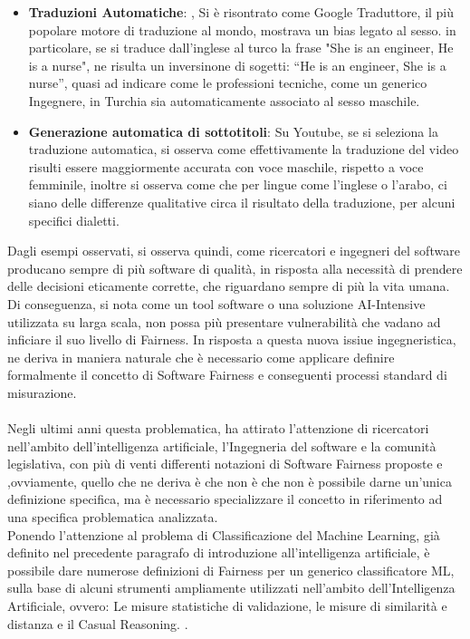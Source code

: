 \begin{itemize}
    \item \textbf{Traduzioni Automatiche}: \cite{biasInML}, Si è risontrato come Google Traduttore, il più popolare motore di traduzione al mondo, mostrava un bias legato al sesso. in particolare, se si traduce dall'inglese al turco la frase "She is an engineer, He is a nurse", ne risulta un inversinone di sogetti: “He is an engineer, She is a nurse”, quasi ad indicare come le professioni tecniche, come un generico Ingegnere, in Turchia sia automaticamente associato al sesso maschile.
    
    \item \textbf{Generazione automatica di sottotitoli}: \cite{tatman-2017-gender} Su Youtube, se si seleziona la traduzione automatica, si osserva come effettivamente la traduzione del video risulti essere maggiormente accurata con voce maschile, rispetto a voce femminile, inoltre si osserva come che per lingue come l'inglese o l'arabo, ci siano delle differenze qualitative circa il risultato della traduzione, per alcuni specifici dialetti.
    

\end{itemize}

Dagli esempi osservati, si osserva quindi, come ricercatori e ingegneri del software producano sempre di più software di qualità, in risposta alla necessità di prendere delle decisioni eticamente corrette, che riguardano sempre di più la vita umana\cite{biasInML}. Di conseguenza, si nota come un tool software o una soluzione AI-Intensive utilizzata su larga scala, non possa più presentare vulnerabilità che vadano ad inficiare il suo livello di Fairness. In risposta a questa nuova issiue ingegneristica, ne deriva in maniera naturale che è necessario come applicare definire formalmente il concetto di Software Fairness e conseguenti processi standard di misurazione.\\\\


\cite{FairnessDefinitionExplained} Negli ultimi anni questa problematica, ha attirato l'attenzione di ricercatori nell'ambito dell'intelligenza artificiale, l'Ingegneria del software e la comunità legislativa, con più di venti differenti notazioni di Software Fairness proposte e ,ovviamente, quello che ne deriva è che non è che non è possibile darne un'unica definizione specifica, ma è necessario specializzare il concetto in riferimento ad una specifica problematica analizzata.\\

 Ponendo l'attenzione al problema di Classificazione del Machine Learning, già definito nel precedente paragrafo di introduzione all'intelligenza artificiale, è possibile dare numerose definizioni di Fairness per un generico classificatore ML, sulla base di alcuni strumenti ampliamente utilizzati nell'ambito dell'Intelligenza Artificiale, ovvero: Le misure statistiche di validazione, le misure di similarità e distanza e il Casual Reasoning. \cite{FairnessDefinitionExplained}.
 
